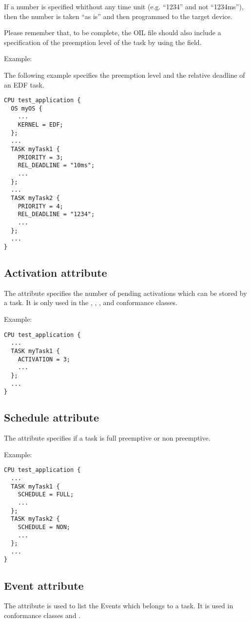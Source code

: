 If a number is specified whithout any time unit (e.g. ``1234'' and not
``1234ms''), then the number is taken ``as is'' and then programmed to
the target device.

Please remember that, to be complete, the OIL
file should also include a specification of the preemption level of
the task by using the  field.

Example:

The following example specifies the preemption level and the relative
deadline of an EDF task.

\begin{lstlisting}
CPU test_application {
  OS myOS {
    ...
    KERNEL = EDF;
  };
  ...
  TASK myTask1 {
    PRIORITY = 3;
    REL_DEADLINE = "10ms";
    ...
  };
  ...
  TASK myTask2 {
    PRIORITY = 4;
    REL_DEADLINE = "1234";
    ...
  };
  ...
}
\end{lstlisting}


\subsection{Activation attribute}
The  attribute specifies the number of pending
activations which can be stored by a task. It is only used in the
, , , and  conformance
classes.

Example:

\begin{lstlisting}
CPU test_application {
  ...
  TASK myTask1 {
    ACTIVATION = 3;
    ...
  };
  ...
}
\end{lstlisting}

\subsection{Schedule attribute}
The  attribute specifies if a task is full preemptive or non preemptive.

Example:

\begin{lstlisting}
CPU test_application {
  ...
  TASK myTask1 {
    SCHEDULE = FULL;
    ...
  };
  TASK myTask2 {
    SCHEDULE = NON;
    ...
  };
  ...
}
\end{lstlisting}

\subsection{Event attribute}
The  attribute is used to list the Events which belongs to
a task. It is used in conformance classes  and
.

